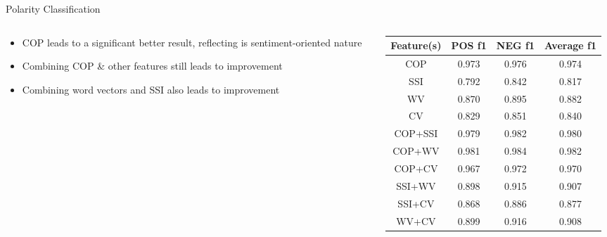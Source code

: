 \documentclass[compress]{beamer}
\begin{document}
        \begin{frame}{Polarity Classification}
            \begin{columns}
                \begin{column}[T]{.5\textwidth}
                    \begin{itemize}
                        \item COP leads to a significant better result, reflecting is sentiment-oriented nature
                        \item Combining COP \& other features still leads to improvement
                        \item Combining word vectors and SSI also leads to improvement %
                    \end{itemize}
                \end{column}
                \begin{column}[T]{.6\textwidth}
                    \begin{table}
                    \small
                    \centering
                    \tabcolsep=0.1cm
                    \begin{tabular}{cccc}
                    \hline
                    Feature(s) & POS f1 & NEG f1 & Average f1 \\ \hline
                    COP        & 0.973  & 0.976  & 0.974      \\ \hline
                    SSI        & 0.792  & 0.842  & 0.817      \\ \hline
                    WV         & 0.870  & 0.895  & 0.882      \\ \hline
                    CV         & 0.829  & 0.851  & 0.840      \\ \hline
                    COP+SSI    & 0.979  & 0.982  & 0.980      \\ \hline
                    COP+WV     & 0.981  & 0.984  & 0.982      \\ \hline
                    COP+CV     & 0.967  & 0.972  & 0.970      \\ \hline
                    SSI+WV     & 0.898  & 0.915  & 0.907      \\ \hline
                    SSI+CV     & 0.868  & 0.886  & 0.877      \\ \hline
                    WV+CV      & 0.899  & 0.916  & 0.908      \\ \hline
                    \end{tabular}
                    \end{table}
                \end{column}
            \end{columns}
        \end{frame}
\end{document}
